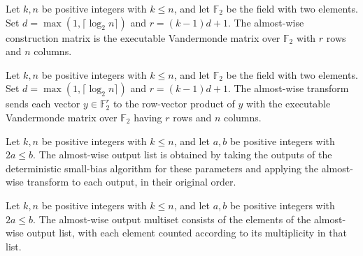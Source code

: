 \begin{definition}
\label{FABL.almostKWiseMatrix}
\leanok
{}
Let $k,n$ be positive integers with $k\le n$, and let $\mathbb F_2$ be the field with
two elements. Set $d=\max(1,\lceil\log_2 n\rceil)$ and $r=(k-1)d+1$. The almost-wise
construction matrix is the executable Vandermonde matrix over $\mathbb F_2$ with $r$
rows and $n$ columns.
\end{definition}

\begin{definition}
\label{FABL.almostKWiseTransform}
\leanok
{}
Let $k,n$ be positive integers with $k\le n$, and let $\mathbb F_2$ be the field with
two elements. Set $d=\max(1,\lceil\log_2 n\rceil)$ and $r=(k-1)d+1$. The almost-wise
transform sends each vector $y\in\mathbb F_2^r$ to the row-vector product of $y$ with
the executable Vandermonde matrix over $\mathbb F_2$ having $r$ rows and $n$ columns.
\end{definition}

\begin{definition}
\label{FABL.almostKWiseOutputList}
\leanok
{}
Let $k,n$ be positive integers with $k\le n$, and let $a,b$ be positive integers with
$2a\le b$. The almost-wise output list is obtained by taking the outputs of the
deterministic small-bias algorithm for these parameters and applying the almost-wise
transform to each output, in their original order.
\end{definition}

\begin{definition}
\label{FABL.almostKWiseOutputMultiset}
\leanok
{}
Let $k,n$ be positive integers with $k\le n$, and let $a,b$ be positive integers with
$2a\le b$. The almost-wise output multiset consists of the elements of the almost-wise
output list, with each element counted according to its multiplicity in that list.
\end{definition}

